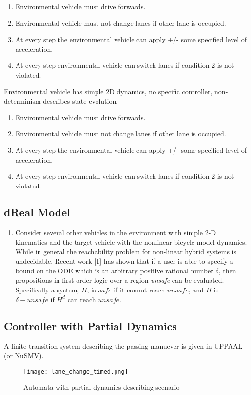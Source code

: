 \begin{enumerate}
	\item Environmental vehicle must drive forwards.
	\item Environmental vehicle must not change lanes if other lane is occupied.
	\item At every step the environmental vehicle can apply +/- some specified level of acceleration.
	\item At every step environmental vehicle can switch lanes if condition 2 is not violated.
\end{enumerate}
Environmental vehicle has simple 2D dynamics, no specific controller, non-determinism describes state evolution.
\begin{enumerate}
	\item Environmental vehicle must drive forwards.
	\item Environmental vehicle must not change lanes if other lane is occupied.
	\item At every step the environmental vehicle can apply +/- some specified level of acceleration.
	\item At every step environmental vehicle can switch lanes if condition 2 is not violated.
\end{enumerate}
\subsection{dReal Model}
\begin{enumerate}
	\item Consider several other vehicles in the environment with simple 2-D kinematics and the target vehicle with the nonlinear bicycle model dynamics. While in general the reachability problem for non-linear hybrid systems is undecidable. Recent work [1] has shown that if a user is able to specify a bound on the ODE which is an arbitrary positive rational number \(\delta\), then propositions in first order logic over a region \textit{unsafe} can be evaluated. Specifically a system, \(H\), is \(safe\) if it cannot reach \(unsafe\), and \(H\) is \(\delta-unsafe\) if \(H^d\) can reach \(unsafe\). 
\end{enumerate}
\subsection{Controller with Partial Dynamics}
A finite transition system describing the passing manuever is given in UPPAAL (or NuSMV).
\begin{figure}[tb]
	\label{fig:discreteview}
	\centering
	\texttt{[image: lane\_change\_timed.png]}
	\caption{Automata with partial dynamics describing scenario}
\end{figure}